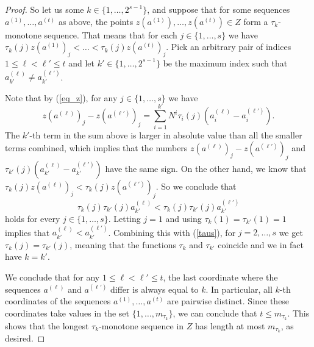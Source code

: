 \documentclass{aic}
\theoremstyle{definition}
\numberwithin{equation}{section}
\numberwithin{figure}{section}
\begin{document}
\begin{proof}
So let us some $k \in \{1, \ldots, 2^{s-1}\}$, and suppose that for some sequences $a^{(1)}, \ldots, a^{(t)}$ as above, the points $z(a^{(1)}), \ldots, z(a^{(t)}) \in Z$ form a $\tau_k$-monotone sequence. That means that for each $j \in \{1, \ldots, s\}$ we have $\tau_k(j) z(a^{(1)})_j<\dots<\tau_k(j) z(a^{(t)})_j$. 
Pick an arbitrary pair of indices $1\le \ell < \ell' \le t$ and let $k' \in \{1, \ldots, 2^{s-1}\}$ be the maximum index such that $a^{(\ell)}_{k'} \neq a^{(\ell')}_{k'}$.

Note that by (\ref{eq_z}), for any $j\in \{1, \ldots, s\}$ we have 
$$
z(a^{(\ell)})_j - z(a^{(\ell')})_j = \sum_{i=1}^{k'} N^i \tau_i(j) (a^{(\ell)}_i - a^{(\ell')}_i).
$$
The $k'$-th term in the sum above is larger in absolute value than all the smaller terms combined, which implies that the numbers $z(a^{(\ell)})_j - z(a^{(\ell')})_j$ and $\tau_{k'}(j)(a^{(\ell)}_{k'} - a^{(\ell')}_{k'})$ have the same sign. On the other hand, we know that $\tau_k(j) z(a^{(\ell)})_j < \tau_k(j) z(a^{(\ell')})_j$. So we conclude that 
\begin{equation}\label{taus}
\tau_{k}(j) \tau_{k'}(j) a^{(\ell)}_{k'} < \tau_{k}(j) \tau_{k'}(j) a^{(\ell')}_{k'}    
\end{equation}
holds for every $j \in \{1, \ldots, s\}$. Letting $j = 1$ and using $\tau_k(1) = \tau_{k'}(1)=1$ implies that $a^{(\ell)}_{k'} < a^{(\ell')}_{k'}$. Combining this with (\ref{taus}), for $j=2,\dots,s$ we get $\tau_k(j) = \tau_{k'}(j)$, meaning that the functions $\tau_k$ and $\tau_{k'}$ coincide and we in fact have $k = k'$.

We conclude that for any $1\le \ell<\ell' \le t$, the last coordinate where the sequences $a^{(\ell)}$ and $a^{(\ell')}$ differ is always equal to $k$. In particular, all $k$-th coordinates of the sequences $a^{(1)}, \ldots, a^{(t)}$ are pairwise distinct. Since these coordinates take values in the set $\{1, \ldots, m_{\tau_k}\}$, we can conclude that $t \le m_{\tau_k}$. This shows that the longest $\tau_k$-monotone sequence in $Z$ has length at most $m_{\tau_k}$, as desired.
\end{proof}
\end{document}
